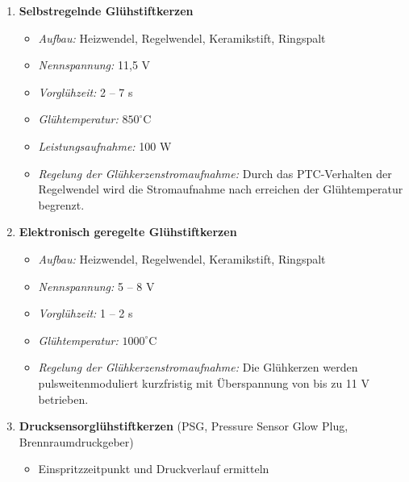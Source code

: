 \begin{enumerate}
\item
  \textbf{Selbstregelnde Glühstiftkerzen}

  \begin{itemize}
  \item
    \emph{Aufbau:} Heizwendel, Regelwendel, Keramikstift, Ringspalt
  \item
    \emph{Nennspannung:} 11,5 V
  \item
    \emph{Vorglühzeit:} 2 -- 7 s
  \item
    \emph{Glühtemperatur:} $850^\circ\text{C}$
  \item
    \emph{Leistungsaufnahme:} 100 W
  \item
    \emph{Regelung der Glühkerzenstromaufnahme:} Durch das PTC-Verhalten
    der Regelwendel wird die Stromaufnahme nach erreichen der
    Glühtemperatur begrenzt.
  \end{itemize}
\item
  \textbf{Elektronisch geregelte Glühstiftkerzen}

  \begin{itemize}
  \item
    \emph{Aufbau:} Heizwendel, Regelwendel, Keramikstift, Ringspalt
  \item
    \emph{Nennspannung:} 5 -- 8 V
  \item
    \emph{Vorglühzeit:} 1 -- 2 s
  \item
    \emph{Glühtemperatur:} $1000^\circ\text{C}$
  \item
    \emph{Regelung der Glühkerzenstromaufnahme:} Die Glühkerzen werden
    pulsweitenmoduliert kurzfristig mit Überspannung von bis zu 11 V
    betrieben.
  \end{itemize}
\item
  \textbf{Drucksensorglühstiftkerzen} (PSG, Pressure Sensor Glow Plug,
  Brennraumdruckgeber)

  \begin{itemize}
  \item
    Einspritzzeitpunkt und Druckverlauf ermitteln
  \end{itemize}
\end{enumerate}
